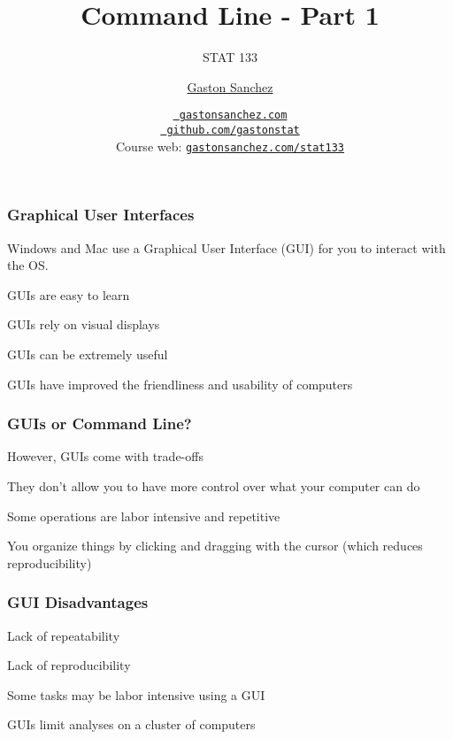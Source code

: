 \documentclass[12pt]{beamer}\usepackage[]{graphicx}\usepackage[]{color}
\title{Command Line - Part 1}
\subtitle{STAT 133}
\author{\href{http://www.gastonsanchez.com}{Gaston Sanchez}}
\institute{Department of Statistics, UC{\textendash}Berkeley}
\date{\href{http://www.gastonsanchez.com}{\tt \scriptsize \color{foreground} gastonsanchez.com}
\\[-4pt]
\href{http://github.com/gastonstat}{\tt \scriptsize \color{foreground} github.com/gastonstat}
\\[-4pt]
{\scriptsize Course web: \href{http://www.gastonsanchez.com/stat133}{\tt gastonsanchez.com/stat133}}
}
\begin{document}
{
  \frame{
    \titlepage
  } 
}


\begin{frame}
\begin{center}
\Huge{}
\end{center}
\end{frame}


\begin{frame}
\frametitle{Graphical User Interfaces}

\bi
  \item Windows and Mac use a Graphical User Interface (GUI) for you to interact with the OS.
  \item GUIs are easy to learn
  \item GUIs rely on visual displays
  \item GUIs can be extremely useful
  \item GUIs have improved the friendliness and usability of computers
\ei

\end{frame}


\begin{frame}
\frametitle{GUIs or Command Line?}

\bi
  \item However, GUIs come with trade-offs
  \item They don't allow you to have more control over what your computer can do
  \item Some operations are labor intensive and repetitive
  \item You organize things by clicking and dragging with the cursor (which reduces reproducibility)
\ei

\end{frame}


\begin{frame}
\frametitle{GUI Disadvantages}
\bbi
  \item Lack of repeatability
  \item Lack of reproducibility
  \item Some tasks may be labor intensive using a GUI
  \item GUIs limit analyses on a cluster of computers
\ei
\end{frame}
\end{document}
